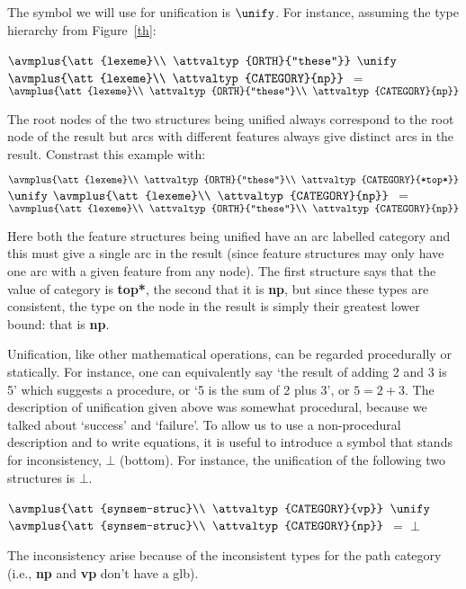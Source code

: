 \documentclass[12pt]{report}
\begin{document}
The symbol we will use for
unification is $\unify$.  For instance, assuming the type
hierarchy from Figure~\ref{th}:
\begin{ex}
{\tiny $\avmplus{\att{lexeme}\\                                             
\attvaltyp{ORTH}{"these"}}$} $\unify$
{\tiny $\avmplus{\att{lexeme}\\
\attvaltyp{CATEGORY}{np}}$}
$=$
{\tiny $\avmplus{\att{lexeme}\\
\attvaltyp{ORTH}{"these"}\\
\attvaltyp{CATEGORY}{np}}$}
\end{ex}
The root nodes of the two structures being
unified always correspond to the root node of the result
but arcs with different features always give distinct
arcs in the result.
Constrast this example with:
\begin{ex}
{\tiny $\avmplus{\att{lexeme}\\ 
\attvaltyp{ORTH}{"these"}\\                                            
\attvaltyp{CATEGORY}{*top*}}$} $\unify$
{\tiny $\avmplus{\att{lexeme}\\
\attvaltyp{CATEGORY}{np}}$}
$=$
{\tiny $\avmplus{\att{lexeme}\\                                              
\attvaltyp{ORTH}{"these"}\\
\attvaltyp{CATEGORY}{np}}$}
\end{ex}
Here both the feature structures being unified have an
arc labelled {\sc category} and this must give a single
arc in the result (since feature structures may 
only have one arc with a given feature from any node).
The first structure says that the value of {\sc category}
is {\bf *top*}, the second that it is {\bf np}, but
since these types are consistent, the type on the
node in the result is simply their greatest lower bound:
that is {\bf np}.

Unification, like other mathematical operations, can be
regarded procedurally or statically.  For instance, 
one can equivalently say `the result of adding 2 and 3 
is 5' which suggests a procedure, or `5 is the sum of 
2 plus 3', or $5=2+3$.   The description of unification
given above was somewhat
procedural, because we talked about `success' and `failure'.
To allow us to use a non-procedural description
and to write equations, it
is useful to introduce a 
symbol that stands for inconsistency, $\bot$ 
(bottom).
For instance, the unification of the following two structures is
$\bot$.
\begin{ex}
{\tiny $\avmplus{\att{synsem-struc}\\
\attvaltyp{CATEGORY}{vp}}$} $\unify$
{\tiny $\avmplus{\att{synsem-struc}\\
\attvaltyp{CATEGORY}{np}}$}
$=$
$\bot$
\end{ex}
The inconsistency arise because of the inconsistent types for the
path {\sc category} (i.e., {\bf np} and {\bf vp} don't have a glb).
\end{document}
